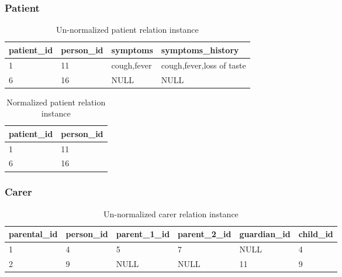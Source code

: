 \subsubsection{Patient}
\begin{table}[H]
\centering
\begin{adjustbox}{width=0.5\textwidth,center=\textwidth}
\begin{tabular}{|l|l|l|l|} 
        \hline
        patient\_id & person\_id & symptoms & symptoms\_history \\ 
        \hline
        1 & 11 & cough,fever & cough,fever,loss of taste\\
        6 & 16 & NULL & NULL\\
        \hline
\end{tabular}
\end{adjustbox}
\caption{Un-normalized patient relation instance}
\end{table}

\begin{table}[H]
\centering
\begin{adjustbox}{width=0.2\textwidth,center=\textwidth}
\begin{tabular}{|l|l|} 
        \hline
        patient\_id & person\_id \\ 
        \hline
        1 & 11 \\
        6 & 16 \\
        \hline
\end{tabular}
\end{adjustbox}
\caption{Normalized patient relation instance}
\end{table}



\subsubsection{Carer}
\begin{table}[H]
\centering
\begin{adjustbox}{width=0.6\textwidth,center=\textwidth}
\begin{tabular}{|l|l|l|l|l|l|} 
        \hline
        parental\_id & person\_id & parent\_1\_id & parent\_2\_id & guardian\_id & child\_id\\ 
        \hline
        1 & 4 & 5 & 7 & NULL & 4\\
        2 & 9 & NULL & NULL & 11 & 9\\
        \hline
\end{tabular}
\end{adjustbox}
\caption{Un-normalized carer relation instance}
\end{table}

